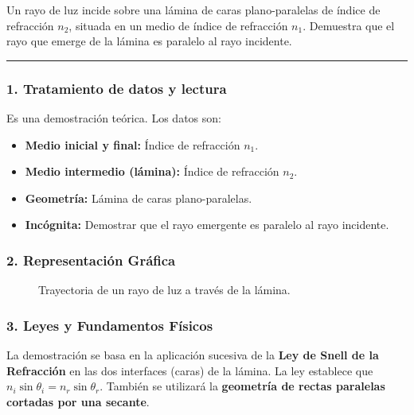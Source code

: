 \begin{cajaenunciado}
Un rayo de luz incide sobre una lámina de caras plano-paralelas de índice de refracción $n_2$, situada en un medio de índice de refracción $n_1$. Demuestra que el rayo que emerge de la lámina es paralelo al rayo incidente.
\end{cajaenunciado}
\hrule

\subsubsection*{1. Tratamiento de datos y lectura}
Es una demostración teórica. Los datos son:
\begin{itemize}
    \item \textbf{Medio inicial y final:} Índice de refracción $n_1$.
    \item \textbf{Medio intermedio (lámina):} Índice de refracción $n_2$.
    \item \textbf{Geometría:} Lámina de caras plano-paralelas.
    \item \textbf{Incógnita:} Demostrar que el rayo emergente es paralelo al rayo incidente.
\end{itemize}

\subsubsection*{2. Representación Gráfica}
\begin{figure}[H]
    \centering
    \caption{Trayectoria de un rayo de luz a través de la lámina.}
\end{figure}

\subsubsection*{3. Leyes y Fundamentos Físicos}
La demostración se basa en la aplicación sucesiva de la \textbf{Ley de Snell de la Refracción} en las dos interfaces (caras) de la lámina. La ley establece que $n_i \sin\theta_i = n_r \sin\theta_r$. También se utilizará la \textbf{geometría de rectas paralelas cortadas por una secante}.

